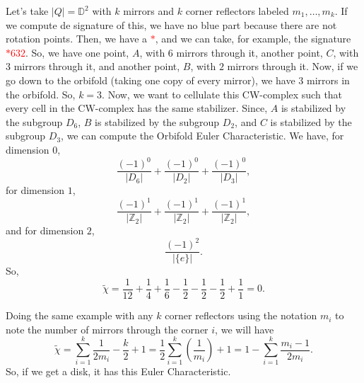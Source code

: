 \begin{example} Let's take $\vert Q \vert = \mathbb{D}^{2}$ with $k$ mirrors and $k$ corner reflectors  labeled $m_{1}, \ldots, m_{k}$. \newline
If we compute de signature of this, we have no blue part because there are not rotation points. Then, we have a \textcolor{red}{$*$}, and we can take, for example, the signature \textcolor{red}{$*632$}. So, we have one point, $A$, with $6$ mirrors through it, another point, $C$, with $3$ mirrors through it, and another point, $B$, with $2$ mirrors through it. Now, if we go down to the orbifold (taking one copy of every mirror), we have $3$ mirrors in the orbifold. So, $k = 3$. Now, we want to cellulate this CW-complex such that every cell in the CW-complex has the same stabilizer. Since, $A$ is stabilized by the subgroup $D_{6}$, $B$ is stabilized by the subgroup $D_{2}$, and $C$ is stabilized by the subgroup $D_{3}$, we can compute the Orbifold Euler Characteristic. \newline
We have, for dimension $0$, $$\frac{(-1)^{0}}{\vert D_{6} \vert} + \frac{(-1)^{0}}{\vert D_{2} \vert} + \frac{(-1)^{0}}{\vert D_{3} \vert},$$ for dimension $1$, $$\frac{(-1)^{1}}{\vert \mathbb{Z}_{2} \vert} + \frac{(-1)^{1}}{\vert \mathbb{Z}_{2} \vert} + \frac{(-1)^{1}}{\vert \mathbb{Z}_{2} \vert},$$ and for dimension $2$, $$\frac{(-1)^{2}}{\vert \lbrace e \rbrace \vert}.$$ \newline
So, $$\tilde{\chi} = \frac{1}{12} + \frac{1}{4} + \frac{1}{6} - \frac{1}{2} - \frac{1}{2} - \frac{1}{2} + \frac{1}{1} = 0.$$
\end{example}

\begin{example} Doing the same example with any $k$ corner reflectors using the notation $m_{i}$ to note the number of mirrors through the corner $i$, we will have $$\tilde{\chi} = \sum_{i = 1}^{k} \frac{1}{2 m_{i}} - \frac{k}{2} + 1 = \frac{1}{2} \sum_{i = 1}^{k} \left(\frac{1}{m_{i}}\right) + 1 = 1 - \sum_{i=1}^{k} \frac{m_{i} - 1}{2 m_{i}}.$$ So, if we get a disk, it has this Euler Characteristic.
\end{example}

